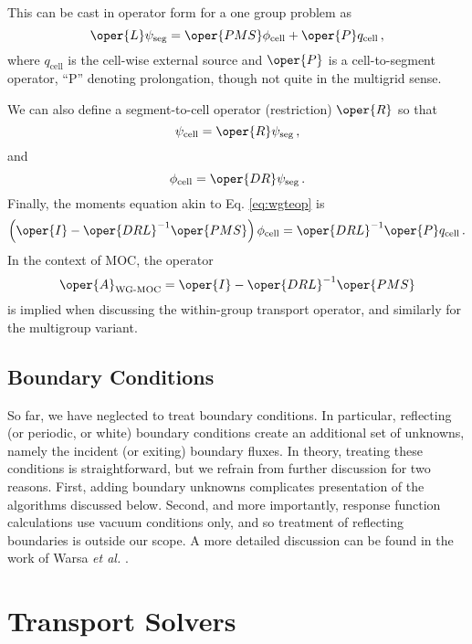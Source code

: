 This can be cast in operator form for a one group problem as
\begin{equation}
  \oper{L}\psi_{\text{seg}} = 
    \oper{P M S}\phi_{\text{cell}} +
      \oper{P} q_{\text{cell}} \, ,
    \label{eq:traneq}
\end{equation}
where $q_{\mathrm{cell}}$ is the cell-wise external source
and $\oper{P}$ is a cell-to-segment operator, ``P'' denoting prolongation,
though not quite in the multigrid sense.  

We can also define a segment-to-cell operator (restriction) 
$\oper{R}$ so that
\begin{equation}
   \psi_{\text{cell}} = \oper{R}\psi_{\text{seg}} \, ,
\end{equation}
and
\begin{equation}
    \phi_{\text{cell}} = \oper{DR}\psi_{\text{seg}} \, . 
    \label{eq:psitophi}
\end{equation}
Finally, the moments equation akin to Eq. \ref{eq:wgteop} is
\begin{equation}
   \left ( \oper{I} -  \oper{DRL}^{-1}\oper{PMS} \right ) 
     \phi_{\text{cell}} =  
  \oper{DRL}^{-1}\oper{P} q_{\text{cell}}  \, .
\end{equation}
In the context of MOC, the operator
\begin{equation}
 \oper{A}_{\text{WG-MOC}} =  \oper{I} -  \oper{DRL}^{-1}\oper{PMS} 
\end{equation}
is implied when discussing the within-group transport operator, and 
similarly for the multigroup variant.

\subsection{Boundary Conditions}

So far, we have neglected to treat boundary conditions.  
In particular, reflecting (or periodic, or white) boundary conditions 
create an additional set of unknowns, namely the incident 
(or exiting) boundary fluxes.  In theory, treating these conditions is
straightforward, but we refrain from further discussion for two 
reasons. First, adding boundary unknowns complicates presentation of 
the algorithms discussed below.  Second, and more importantly,
response function calculations use vacuum conditions 
only, and so treatment of reflecting boundaries is outside our scope.
A more detailed discussion can be found in the work 
of Warsa \emph{et al.} \cite{warsa2004kim}.

\section{Transport Solvers}

